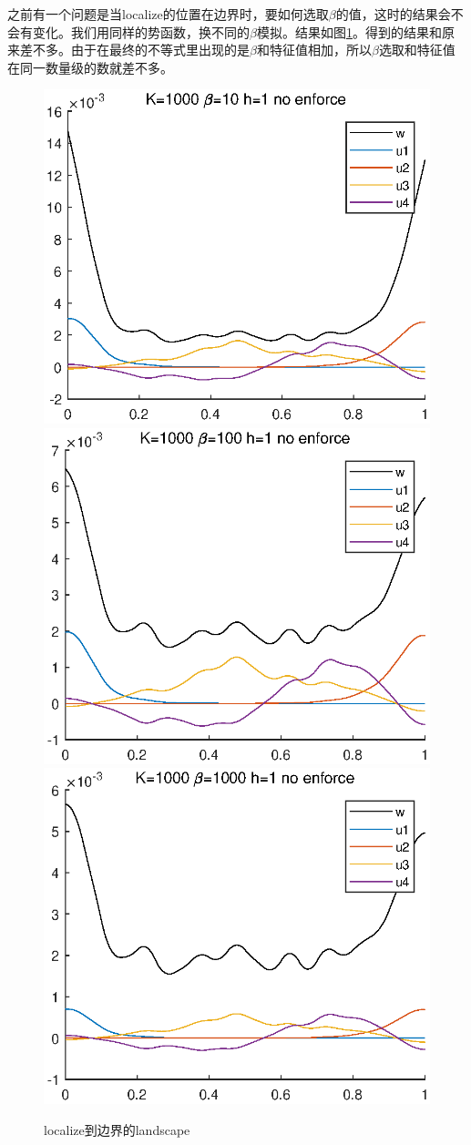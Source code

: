\documentclass[UTF8,12pt]{article}
\begin{document}
之前有一个问题是当localize的位置在边界时，要如何选取$\beta$的值，这时的结果会不会有变化。我们用同样的势函数，换不同的$\beta$模拟。结果如图\ref{fig9}。得到的结果和原来差不多。由于在最终的不等式里出现的是$\beta$和特征值相加，所以$\beta$选取和特征值在同一数量级的数就差不多。
\begin{figure}[htbp]
    \centering
    \includegraphics[width=0.3\linewidth]{pic/bdb2}
    \includegraphics[width=0.3\linewidth]{pic/bdb3}
    \includegraphics[width=0.3\linewidth]{pic/bdb4}
    \label{fig9}
\caption{localize到边界的landscape}
\end{figure}
\end{document}
